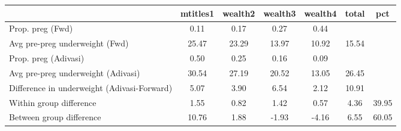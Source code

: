 \begin{tabular}{l*{6}{c}}
\toprule
            &\multicolumn{1}{c}{mtitles1}&\multicolumn{1}{c}{wealth2}&\multicolumn{1}{c}{wealth3}&\multicolumn{1}{c}{wealth4}&\multicolumn{1}{c}{total}&\multicolumn{1}{c}{pct}\\
\midrule
\midrule
Prop. preg (Fwd)&        0.11&        0.17&        0.27&        0.44&            &            \\
Avg pre-preg underweight (Fwd)&       25.47&       23.29&       13.97&       10.92&       15.54&            \\
Prop. preg (Adivasi)&        0.50&        0.25&        0.16&        0.09&            &            \\
Avg pre-preg underweight (Adivasi)&       30.54&       27.19&       20.52&       13.05&       26.45&            \\
Difference in underweight (Adivasi-Forward)&        5.07&        3.90&        6.54&        2.12&       10.91&            \\
Within group difference&        1.55&        0.82&        1.42&        0.57&        4.36&       39.95\\
Between group difference&       10.76&        1.88&       -1.93&       -4.16&        6.55&       60.05\\
\bottomrule
\end{tabular}
